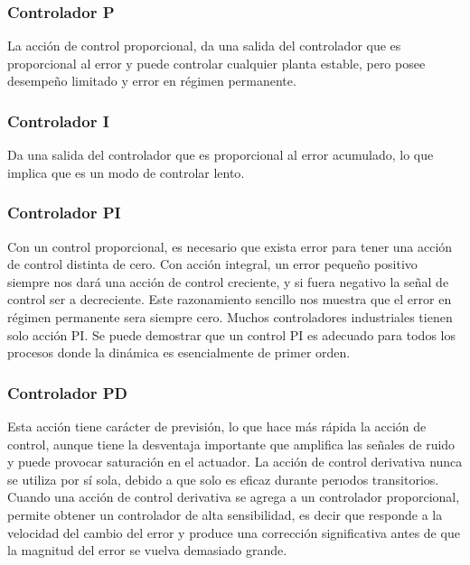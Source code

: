 \subsubsection*{Controlador P }

La acción de control proporcional, da una salida del controlador que es proporcional al error y puede
controlar cualquier planta estable, pero posee desempeño limitado y error en régimen permanente\cite{Mazzone2012}.

\subsubsection*{Controlador I }

Da una salida del controlador que es proporcional al error acumulado, lo que implica que es un modo de controlar lento\cite{Mazzone2012}.

\subsubsection*{Controlador PI }

Con un control proporcional, es necesario que exista error para tener una acción de control distinta de cero. Con acción integral, un error pequeño positivo siempre nos dará una acción de control creciente, y si fuera negativo la señal de control ser a decreciente. Este razonamiento sencillo nos muestra que el error en régimen permanente sera siempre cero. Muchos controladores industriales tienen solo acción PI. Se puede demostrar que un control PI es adecuado para todos los procesos donde la dinámica es esencialmente de primer orden\cite{Mazzone2012}.

\subsubsection*{Controlador PD }

Esta acción tiene carácter de previsión, lo que hace más rápida la acción de control, aunque tiene la desventaja importante que amplifica las señales de ruido y puede provocar saturación en el actuador. La acción de control derivativa nunca se utiliza por sí sola, debido a que solo es eficaz durante perıodos transitorios. Cuando una acción de control derivativa se agrega a un controlador proporcional, permite obtener un controlador de alta sensibilidad, es decir que responde a la velocidad del cambio del error y produce una corrección significativa antes de que la magnitud del error se vuelva demasiado grande.

